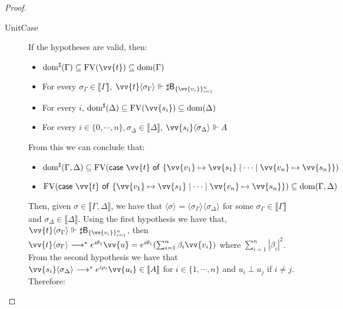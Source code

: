 \documentclass[runningheads,orivec,envcountsame,envcountsect]{llncs}
\newcommand\lra{\longrightarrow}
\newcommand\ansubst[2]{\ensuremath{\langle #1 \rangle_{#2}}}
\newcommand\dom[1]{\mathrm{dom}(#1)}
\newcommand\sdom[1]{\mathrm{dom}^{\sharp}(#1)}
\newcommand\FV[1]{\mathrm{FV}(#1)}
\def\gencase#1#2#3#4#5{\ensuremath{\mathsf{case}~#1~\mathsf{of}~\{#2\mapsto #4 \mid \dotsb \mid #3\mapsto #5\}}}
\def\eval{\lra^*}
\def\sem#1{\llbracket#1\rrbracket}
\def\real{\Vdash}
\newcommand\basis[1]{\ensuremath{\mathsf{B}_{#1}}}
\newcommand\genbasis[3]{\ensuremath{\basis{\{#1\}_{#2}^{#3}}}}
\begin{document}
\begin{proof}
\begin{description}
    \item[UnitCase] If the hypotheses are valid, then:
    \begin{itemize}
        \item $\sdom{\Gamma}\subseteq \FV{\vv{t}}\subseteq \dom{\Gamma}$
        \item For every $\sigma_\Gamma\in\sem{\Gamma}$, $\vv{t}\ansubst{\sigma_\Gamma}{}\real\sharp\genbasis{\vv{v_i}}{i=1}{n}$
        \item For every $i$, $\sdom{\Delta}\subseteq \FV{\vv{s_i}}\subseteq \dom{\Delta}$
        \item For every $i\in\{0,\dotsb ,n\}, \sigma_\Delta\in\sem{\Delta}$, $\vv{s_i}\ansubst{\sigma_\Delta}{}\real A$
    \end{itemize}
    
    From this we can conclude that:
    
    \begin{itemize}
        \item $\sdom{\Gamma,\Delta}\subseteq \FV{\gencase{\vv{t}}{\vv{v_1}}{\vv{v_n}}{\vv{s_1}}{\vv{s_n}}}$
        \item $\FV{\gencase{\vv{t}}{\vv{v_1}}{\vv{v_n}}{\vv{s_1}}{\vv{s_n}}}\subseteq \dom{\Gamma,\Delta}$
    \end{itemize}
    
    Then, given $\sigma\in\sem{\Gamma,\Delta}$, we have that $\ansubst{\sigma}{}=\ansubst{\sigma_\Gamma}{}\ansubst{\sigma_\Delta}{}$ for some $\sigma_\Gamma\in\sem{\Gamma}$ and $\sigma_\Delta\in\sem{\Delta}$. Using the first hypothesis we have that, $\vv{t}\ansubst{\sigma_\Gamma}{}\real\sharp\genbasis{\vv{v_i}}{i=1}{n}$, then $\vv{t}\ansubst{\sigma_\Gamma}{}\eval e^{i\theta_1} \vv{u}=e^{i\theta_1} (\sum_{i=1}^{n}\beta_i \vv{v_i})$ where $\sum_{i=1}^{n}|\beta_i|^2$. From the second hypothesis we have that $\vv{s_i}\ansubst{\sigma_\Delta}{}\eval e^{i\rho_i} \vv{u_i}\in\sem{A}$ for $i\in\{1,\dotsb ,n\}$ and $u_i\perp u_j$ if $i\neq j$. Therefore:


\end{description}
\end{proof}
\end{document}
